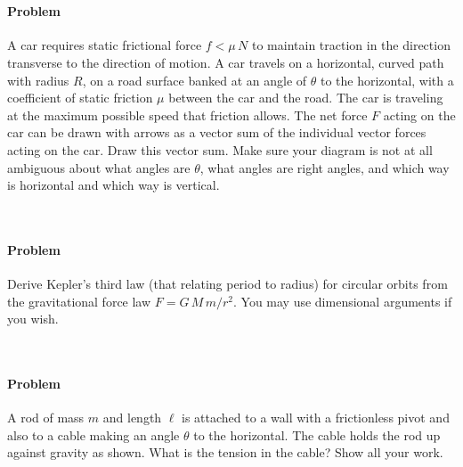 \documentclass[12pt,letterpaper]{article}
\newcounter{problem}
\begin{document}
~ \vfill ~

\clearpage

\paragraph{Problem~\theproblem}%
A car requires static frictional force $f<\mu\,N$ to maintain traction
in the direction transverse to the direction of motion.  A car travels
on a horizontal, curved path with radius $R$, on a road surface banked
at an angle of $\theta$ to the horizontal, with a coefficient of
static friction $\mu$ between the car and the road.  The car is
traveling at the maximum possible speed that friction allows.  The net
force $F$ acting on the car can be drawn with arrows as a vector sum
of the individual vector forces acting on the car.  Draw this vector
sum.  Make sure your diagram is not at all ambiguous about what angles
are $\theta$, what angles are right angles, and which way is
horizontal and which way is vertical.

~ \vfill ~

\paragraph{Problem~\theproblem}%
Derive Kepler's third law (that relating period to radius) for
circular orbits from the gravitational force law $F=G\,M\,m/r^2$.  You
may use dimensional arguments if you wish.

~ \vfill ~

\clearpage

\paragraph{Problem~\theproblem}%
A rod of mass $m$ and length $\ell$ is attached to a wall with a
frictionless pivot and also to a cable making an angle $\theta$ to the
horizontal.  The cable holds the rod up against gravity as shown.
What is the tension in the cable?  Show all your work.%
%
\end{document}
